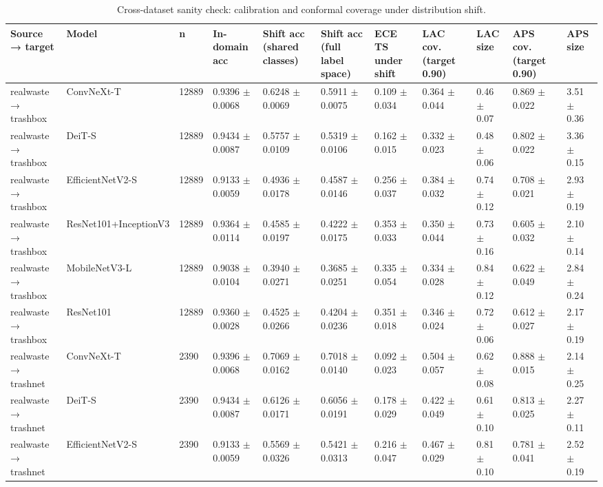 \begin{table}[ht]
\centering
\small
\caption{Cross-dataset sanity check: calibration and conformal coverage under distribution shift.}
\label{tab:tab10_cross_dataset}
\begin{tabular}{lllllllllll}
\hline
Source → target & Model & n & In-domain acc & Shift acc (shared classes) & Shift acc (full label space) & ECE TS under shift & LAC cov. (target 0.90) & LAC size & APS cov. (target 0.90) & APS size \\
\hline
realwaste → trashbox & ConvNeXt-T & 12889 & 0.9396 $\pm$ 0.0068 & 0.6248 $\pm$ 0.0069 & 0.5911 $\pm$ 0.0075 & 0.109 $\pm$ 0.034 & 0.364 $\pm$ 0.044 & 0.46 $\pm$ 0.07 & 0.869 $\pm$ 0.022 & 3.51 $\pm$ 0.36 \\
realwaste → trashbox & DeiT-S & 12889 & 0.9434 $\pm$ 0.0087 & 0.5757 $\pm$ 0.0109 & 0.5319 $\pm$ 0.0106 & 0.162 $\pm$ 0.015 & 0.332 $\pm$ 0.023 & 0.48 $\pm$ 0.06 & 0.802 $\pm$ 0.022 & 3.36 $\pm$ 0.15 \\
realwaste → trashbox & EfficientNetV2-S & 12889 & 0.9133 $\pm$ 0.0059 & 0.4936 $\pm$ 0.0178 & 0.4587 $\pm$ 0.0146 & 0.256 $\pm$ 0.037 & 0.384 $\pm$ 0.032 & 0.74 $\pm$ 0.12 & 0.708 $\pm$ 0.021 & 2.93 $\pm$ 0.19 \\
realwaste → trashbox & ResNet101+InceptionV3 & 12889 & 0.9364 $\pm$ 0.0114 & 0.4585 $\pm$ 0.0197 & 0.4222 $\pm$ 0.0175 & 0.353 $\pm$ 0.033 & 0.350 $\pm$ 0.044 & 0.73 $\pm$ 0.16 & 0.605 $\pm$ 0.032 & 2.10 $\pm$ 0.14 \\
realwaste → trashbox & MobileNetV3-L & 12889 & 0.9038 $\pm$ 0.0104 & 0.3940 $\pm$ 0.0271 & 0.3685 $\pm$ 0.0251 & 0.335 $\pm$ 0.054 & 0.334 $\pm$ 0.028 & 0.84 $\pm$ 0.12 & 0.622 $\pm$ 0.049 & 2.84 $\pm$ 0.24 \\
realwaste → trashbox & ResNet101 & 12889 & 0.9360 $\pm$ 0.0028 & 0.4525 $\pm$ 0.0266 & 0.4204 $\pm$ 0.0236 & 0.351 $\pm$ 0.018 & 0.346 $\pm$ 0.024 & 0.72 $\pm$ 0.06 & 0.612 $\pm$ 0.027 & 2.17 $\pm$ 0.19 \\
realwaste → trashnet & ConvNeXt-T & 2390 & 0.9396 $\pm$ 0.0068 & 0.7069 $\pm$ 0.0162 & 0.7018 $\pm$ 0.0140 & 0.092 $\pm$ 0.023 & 0.504 $\pm$ 0.057 & 0.62 $\pm$ 0.08 & 0.888 $\pm$ 0.015 & 2.14 $\pm$ 0.25 \\
realwaste → trashnet & DeiT-S & 2390 & 0.9434 $\pm$ 0.0087 & 0.6126 $\pm$ 0.0171 & 0.6056 $\pm$ 0.0191 & 0.178 $\pm$ 0.029 & 0.422 $\pm$ 0.049 & 0.61 $\pm$ 0.10 & 0.813 $\pm$ 0.025 & 2.27 $\pm$ 0.11 \\
realwaste → trashnet & EfficientNetV2-S & 2390 & 0.9133 $\pm$ 0.0059 & 0.5569 $\pm$ 0.0326 & 0.5421 $\pm$ 0.0313 & 0.216 $\pm$ 0.047 & 0.467 $\pm$ 0.029 & 0.81 $\pm$ 0.10 & 0.781 $\pm$ 0.041 & 2.52 $\pm$ 0.19 \\

\end{tabular}
\end{table}
